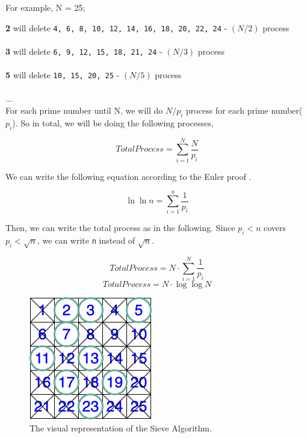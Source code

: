 \documentclass[12pt]{article}
\begin{document}
For example, N = 25;

\textbf{2} will delete \texttt{4, 6, 8, 10, 12, 14, 16, 18, 20, 22, 24} - $(N/2)$ process \\ \\ 
\textbf{3} will delete \texttt{6, 9, 12, 15, 18, 21, 24} - $(N/3)$ process \\ \\
\textbf{5} will delete \texttt{10, 15, 20, 25} - $(N/5)$ process \\ \\
... \\

For each prime number until N, we will do $N/p_i$ process for each prime number($p_i$). So in total, we will be doing the following processes,

\[ TotalProcess = \sum_{i=1}^{N} \frac{N}{p_i}\]

We can write the following equation according to the Euler proof \cite{sieveeuler}.

\[\ln{\ln{n}}= \sum_{i=1}^{n} \frac{1}{p_i} \]

Then, we can write the total process as in the following. Since $p_i < n$ covers $p_i<\sqrt{n}$, we can write \texttt{n} instead of \texttt{$\sqrt{n}$}.

\[ TotalProcess = N \cdot \sum_{i=1}^{N} \frac{1}{p_i} \]
\[ TotalProcess = N \cdot \log{\log{N}}  \]


\begin{figure}[H]
\centering
\includegraphics[]{Prime.png}
\caption{The visual representation of the Sieve Algorithm.}
\label{fig:prime1}
\end{figure}
\end{document}
